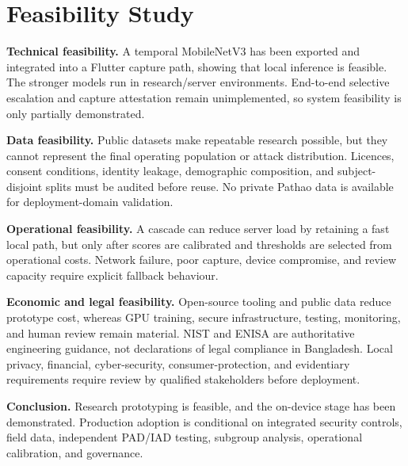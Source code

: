 \section{Feasibility Study}

\textbf{Technical feasibility.} A temporal MobileNetV3 has been exported and
integrated into a Flutter capture path, showing that local inference is feasible.
The stronger models run in research/server environments. End-to-end selective
escalation and capture attestation remain unimplemented, so system feasibility is
only partially demonstrated.

\textbf{Data feasibility.} Public datasets make repeatable research possible, but
they cannot represent the final operating population or attack distribution.
Licences, consent conditions, identity leakage, demographic composition, and
subject-disjoint splits must be audited before reuse. No private Pathao data is
available for deployment-domain validation.

\textbf{Operational feasibility.} A cascade can reduce server load by retaining a
fast local path, but only after scores are calibrated and thresholds are selected
from operational costs. Network failure, poor capture, device compromise, and
review capacity require explicit fallback behaviour.

\textbf{Economic and legal feasibility.} Open-source tooling and public data
reduce prototype cost, whereas GPU training, secure infrastructure, testing,
monitoring, and human review remain material. NIST and ENISA are authoritative
engineering guidance, not declarations of legal compliance in Bangladesh. Local
privacy, financial, cyber-security, consumer-protection, and evidentiary
requirements require review by qualified stakeholders before deployment.

\textbf{Conclusion.} Research prototyping is feasible, and the on-device stage
has been demonstrated. Production adoption is conditional on integrated security
controls, field data, independent PAD/IAD testing, subgroup analysis, operational
calibration, and governance.

